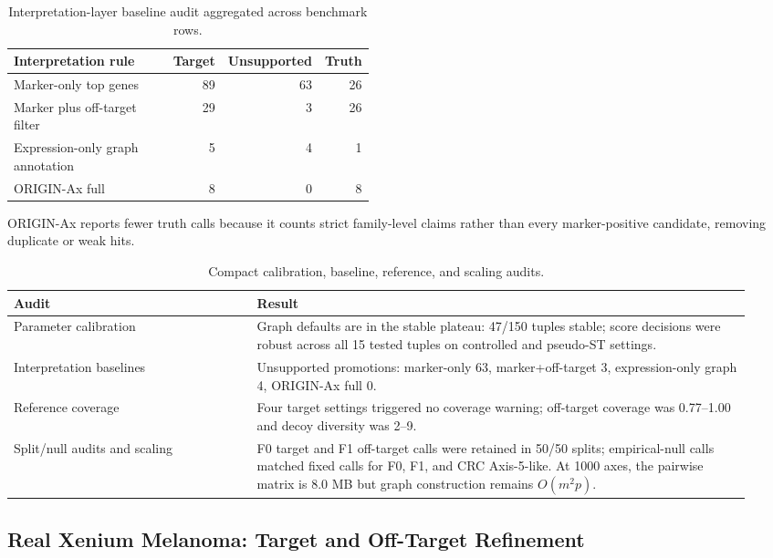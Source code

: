 \documentclass[conference]{IEEEtran}
\begin{document}
\begin{table}[!t]
\caption{Interpretation-layer baseline audit aggregated across benchmark rows.}
\label{tab:interpretation_baselines}
\centering
\scriptsize
\setlength{\tabcolsep}{3pt}
\begin{tabular}{p{0.46\linewidth}rrr}
\toprule
Interpretation rule & Target & Unsupported & Truth \\
\midrule
Marker-only top genes & 89 & 63 & 26 \\
Marker plus off-target filter & 29 & 3 & 26 \\
Expression-only graph annotation & 5 & 4 & 1 \\
ORIGIN-Ax full & 8 & 0 & 8 \\
\bottomrule
\end{tabular}
\setlength{\tabcolsep}{6pt}
\end{table}

ORIGIN-Ax reports fewer truth calls because it counts strict family-level claims
rather than every marker-positive candidate, removing duplicate or weak hits.

\begin{table}[!t]
\caption{Compact calibration, baseline, reference, and scaling audits.}
\label{tab:robustness}
\centering
\scriptsize
\setlength{\tabcolsep}{2pt}
\begin{tabular}{p{0.31\linewidth}p{0.63\linewidth}}
\toprule
Audit & Result \\
\midrule
Parameter calibration &
Graph defaults are in the stable plateau: 47/150 tuples stable; score decisions
were robust across all 15 tested tuples on controlled and pseudo-ST settings. \\
Interpretation baselines &
Unsupported promotions: marker-only 63, marker+off-target 3,
expression-only graph 4, ORIGIN-Ax full 0. \\
Reference coverage &
Four target settings triggered no coverage warning; off-target coverage was
0.77--1.00 and decoy diversity was 2--9. \\
Split/null audits and scaling &
F0 target and F1 off-target calls were retained in 50/50 splits; empirical-null
calls matched fixed calls for F0, F1, and CRC Axis-5-like. At 1000 axes, the
pairwise matrix is 8.0 MB but graph construction remains $O(m^2p)$. \\
\bottomrule
\end{tabular}
\setlength{\tabcolsep}{6pt}
\end{table}

\subsection{Real Xenium Melanoma: Target and Off-Target Refinement}
\end{document}
